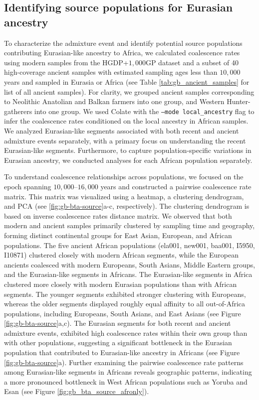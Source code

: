 \clearpage

\subsection{Identifying source populations for Eurasian ancestry}
\label{sec:ch3-gb-bta-source}

To characterize the admixture event and identify potential source populations contributing Eurasian-like ancestry to Africa, we calculated coalescence rates using modern samples from the HGDP+$1{,}000$GP dataset and a subset of 40 high-coverage ancient samples with estimated sampling ages less than $10{,}000$ years and sampled in Eurasia or Africa (see Table \ref{tab:gb_ancient_samples} for list of all ancient samples). For clarity, we grouped ancient samples corresponding to Neolithic Anatolian and Balkan farmers into one group, and Western Hunter-gatherers into one group. We used Colate \cite{speidel2021inferring} with the \texttt{--mode local\_ancestry} flag to infer the coalescence rates conditioned on the local ancestry in African samples. We analyzed Eurasian-like segments associated with both recent and ancient admixture events separately, with a primary focus on understanding the recent Eurasian-like segments. Furthermore, to capture population-specific variations in Eurasian ancestry, we conducted analyses for each African population separately. 

To understand coalescence relationships across populations, we focused on the epoch spanning $10{,}000$–$16{,}000$ years and constructed a pairwise coalescence rate matrix. This matrix was visualized using a heatmap, a clustering dendrogram, and PCA (see \ref{fig:gb-bta-source}a-c, respectively). The clustering dendrogram is based on inverse coalescence rates distance matrix. We observed that both modern and ancient samples primarily clustered by sampling time and geography, forming distinct continental groups for East Asian, European, and African populations. The five ancient African populations (ela001, new001, baa001, I5950, I10871) clustered closely with modern African segments, while the European ancients coalesced with modern Europeans, South Asians, Middle Eastern groups, and the Eurasian-like segments in Africans. The Eurasian-like segments in Africa clustered more closely with modern Eurasian populations than with African segments. The younger segments exhibited stronger clustering with Europeans, whereas the older segments displayed roughly equal affinity to all out-of-Africa populations, including Europeans, South Asians, and East Asians (see Figure \ref{fig:gb-bta-source}a,c). The Eurasian segments for both recent and ancient admixture events, exhibited high coalescence rates within their own group than with other populations, suggesting a significant bottleneck in the Eurasian population that contributed to Eurasian-like ancestry in Africans (see Figure \ref{fig:gb-bta-source}a). Further examining the pairwise coalescence rate patterns among Eurasian-like segments in Africans reveals geographic patterns, indicating a more pronounced bottleneck in West African populations such as Yoruba and Esan (see Figure \ref{fig:gb_bta_source_afronly}).

